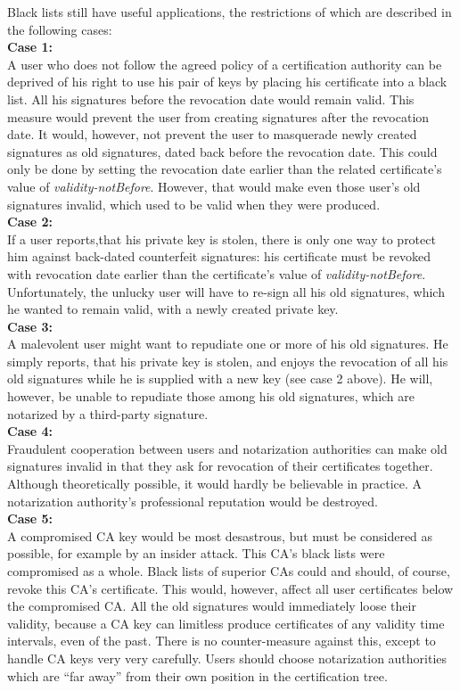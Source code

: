Black lists still have useful applications,
the restrictions of which are described in the following cases:
\\[1ex]
{\bf Case 1:}
\\[1ex]
A user who does not follow the agreed policy of a certification
authority can be deprived of his right to use his pair of
keys by placing his certificate
into a black list.
All his signatures before the revocation date would remain valid.
This measure would prevent the user from creating signatures
after the revocation date.
It would, however, not prevent the user to masquerade
newly created signatures as old signatures, dated back before
the revocation date.
This could only be done by setting the revocation date
earlier than the related certificate's value of {\em validity-notBefore}.
However, that would make even those user's old signatures invalid,
which used to be valid when they were produced.
\\[1ex]
{\bf Case 2:}
\\[1ex]
If a user reports,that his private key is stolen,
there is only one way to protect him against
back-dated counterfeit signatures:
his certificate must be revoked with revocation date
earlier than the certificate's value of {\em validity-notBefore}.
Unfortunately, the unlucky user will have to re-sign
all his old signatures,
which he wanted to remain valid, with a newly created private key.
\\[1ex]
{\bf Case 3:}
\\[1ex]
A malevolent user might want to repudiate one or more of his old signatures.
He simply reports, that his private key is stolen,
and enjoys the revocation of all his old signatures
while he is supplied with a new key (see case 2 above).
He will, however, be unable to repudiate
those among his old signatures, which are notarized
by a third-party signature.
\\[1ex]
{\bf Case 4:}
\\[1ex]
Fraudulent cooperation between users and notarization authorities
can make old signatures invalid in that they ask for revocation
of their certificates together. Although theoretically possible,
it would hardly be believable in practice.
A notarization authority's professional reputation would be destroyed.
\\[1ex]
{\bf Case 5:}
\\[1ex]
A compromised CA key would be most desastrous, but must be
considered as possible, for example by an insider attack.
This CA's black lists were compromised as a whole.
Black lists of superior CAs could and should, of course,
revoke this CA's certificate.
This would, however, affect all user certificates below
the compromised CA.
All the old signatures would immediately loose their validity,
because a CA key can limitless produce certificates of any
validity time intervals, even of the past.
There is no counter-measure against this,
except to handle CA keys very very carefully.
Users should choose notarization authorities which
are ``far away'' from their own position in the certification tree.


